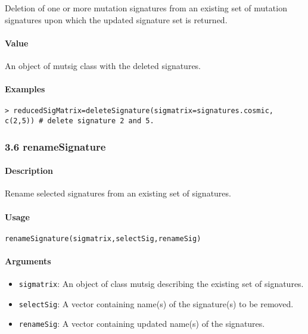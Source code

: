 \documentclass[]{article}
\providecommand{\tightlist}{%
  \setlength{\itemsep}{0pt}\setlength{\parskip}{0pt}}
\let\oldparagraph\paragraph
\renewcommand{\paragraph}[1]{\oldparagraph{#1}\mbox{}}
\begin{document}
Deletion of one or more mutation signatures from an existing set of
mutation signatures upon which the updated signature set is returned.

\paragraph{\texorpdfstring{\textbf{Value}}{Value}}\label{value-2}

An object of mutsig class with the deleted signatures.

\paragraph{\texorpdfstring{\textbf{Examples}}{Examples}}\label{examples-4}

\begin{verbatim}
> reducedSigMatrix=deleteSignature(sigmatrix=signatures.cosmic, c(2,5)) # delete signature 2 and 5.
\end{verbatim}

\subsubsection{3.6 renameSignature}\label{renamesignature}

\paragraph{\texorpdfstring{\textbf{Description}}{Description}}\label{description-5}

Rename selected signatures from an existing set of signatures.

\paragraph{\texorpdfstring{\textbf{Usage}}{Usage}}\label{usage-5}

\texttt{renameSignature(sigmatrix,selectSig,renameSig)}

\paragraph{\texorpdfstring{\textbf{Arguments
}}{Arguments }}\label{arguments-4}

\begin{itemize}
\tightlist
\item
  \texttt{sigmatrix}: An object of class mutsig describing the existing
  set of signatures.
\item
  \texttt{selectSig}: A vector containing name(s) of the signature(s) to
  be removed.
\item
  \texttt{renameSig}: A vector containing updated name(s) of the
  signatures.
\end{itemize}
\end{document}
